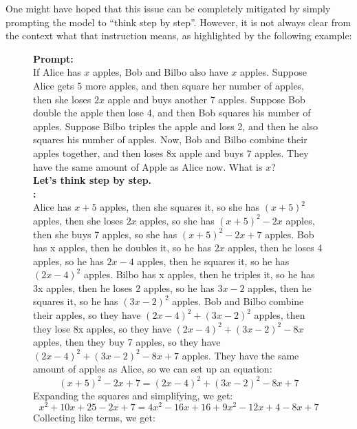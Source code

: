 One might have hoped that this issue can be completely mitigated by simply prompting the model to ``think step by step''. However, it is not always clear from the context what that instruction means, as highlighted by the following example:

\begin{comment}
The ``skipping step'' seems to be solvable if we ask the model with the previously proposed prompt: ``Let's think step by step''. However, \textbf{we see that if we hide $(x + 5)^2 - 2x + 7 = (2x - 4)^2 + (3x - 2)^2 - 8x + 7$ as some intermediate steps of the question, then the model still thinks that ``solving $(x + 5)^2 - 2x + 7 = (2x - 4)^2 + (3x - 2)^2 - 8x + 7$'' is one intermediate step, and then still skips the step for simplification:}
\end{comment}
\begin{figure}[H]
\begin{AIbox}{\DV}
{\bf Prompt:} \\
{\scriptsize
If Alice has $x$ apples, Bob and Bilbo also have $x$ apples. Suppose Alice gets 5 more apples, and then square her number of apples, then she loses $2x$ apple and buys another 7 apples. Suppose Bob double the apple then lose 4, and then Bob squares his number of apples. Suppose Bilbo triples the apple and loss 2, and then he also squares his number of apples. Now, Bob and Bilbo combine their apples together, and then loses 8x apple and buys 7 apples. They have the same amount of Apple as Alice now. What is $x$? \\
\textbf{Let's think step by step.}
}\\

{\bf \DV:} \\
{\scriptsize
Alice has $x + 5$ apples, then she squares it, so she has $(x + 5)^2$ apples, then she loses $2x$ apples, so she has $(x + 5)^2 - 2x$ apples, then she buys 7 apples, so she has $(x + 5)^2 - 2x + 7$ apples.
Bob has x apples, then he doubles it, so he has $2x$ apples, then he loses 4 apples, so he has $2x - 4$ apples, then he squares it, so he has $(2x - 4)^2$ apples.
Bilbo has x apples, then he triples it, so he has 3x apples, then he loses 2 apples, so he has $3x - 2$ apples, then he squares it, so he has $(3x - 2)^2$ apples.
Bob and Bilbo combine their apples, so they have $(2x - 4)^2 + (3x - 2)^2$ apples, then they lose 8x apples, so they have $(2x - 4)^2 + (3x - 2)^2 - 8x$ apples, then they buy 7 apples, so they have $(2x - 4)^2 + (3x - 2)^2 - 8x + 7$ apples.
They have the same amount of apples as Alice, so we can set up an equation:
$$(x + 5)^2 - 2x + 7 = (2x - 4)^2 + (3x - 2)^2 - 8x + 7$$
Expanding the squares and simplifying, we get:
$$x^2 + 10x + 25 - 2x + 7 = 4x^2 - 16x + 16 + 9x^2 - 12x + 4 - 8x + 7$$
Collecting like terms, we get:
}
\end{AIbox}
\end{figure}

